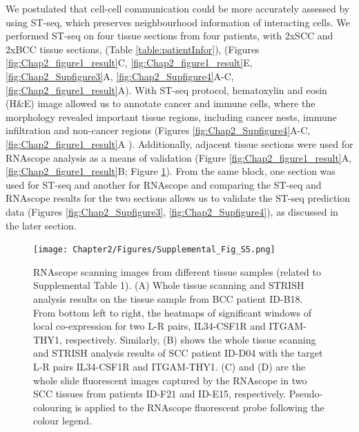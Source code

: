 We postulated that cell-cell communication could be more accurately assessed by using ST-seq, which preserves neighbourhood information of interacting cells. We performed ST-seq on four tissue sections from four patients, with 2xSCC and 2xBCC tissue sections, (Table \ref{table:patientInfor}), (Figures \ref{fig:Chap2_figure1_result}C, \ref{fig:Chap2_figure1_result}E, \ref{fig:Chap2_Supfigure3}A, \ref{fig:Chap2_Supfigure4}A-C, \ref{fig:Chap2_figure1_result}A).  With ST-seq protocol, hematoxylin and eosin (H\&E) image allowed us to annotate cancer and immune cells, where the morphology revealed important tissue regions, including cancer nests, immune infiltration and non-cancer regions (Figures \ref{fig:Chap2_Supfigure4}A-C,\ref{fig:Chap2_figure1_result}A ). Additionally, adjacent tissue sections were used for RNAscope analysis as a means of validation (Figure \ref{fig:Chap2_figure1_result}A, \ref{fig:Chap2_figure1_result}B;  Figure \ref{fig:Chap2_Supfigure5}).  From the same block, one section was used for ST-seq and another for RNAscope and comparing the ST-seq and RNAscope results for the two sections allows us to validate the ST-seq prediction data (Figures \ref{fig:Chap2_Supfigure3}, \ref{fig:Chap2_Supfigure4}), as discussed in the later section. 

\begin{figure}[htp]
\centering
\texttt{[image: Chapter2/Figures/Supplemental\_Fig\_S5.png]}
\caption[RNAscope scanning images from different tissue samples]{RNAscope scanning images from different tissue samples (related to Supplemental Table 1). (A) Whole tissue scanning and STRISH analysis results on the tissue sample from BCC patient ID-B18. From bottom left to right, the heatmaps of significant windows of local co-expression for two L-R pairs, IL34-CSF1R and ITGAM-THY1, respectively. Similarly, (B) shows the whole tissue scanning and STRISH analysis results of SCC patient ID-D04 with the target L-R pairs IL34-CSF1R and ITGAM-THY1. (C) and (D) are the whole slide fluorescent images captured by the RNAscope in two SCC tissues from patients ID-F21 and ID-E15, respectively. Pseudo-colouring is applied to the RNAscope fluorescent probe following the colour legend.}
\label{fig:Chap2_Supfigure5}
\end{figure}


